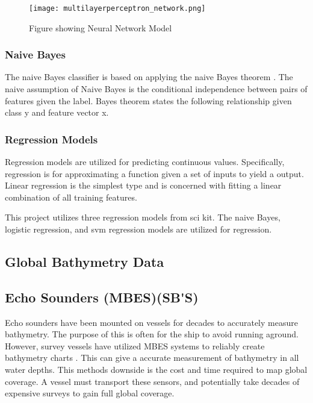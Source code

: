 \begin{figure}[h]
    \centering
    \texttt{[image: multilayerperceptron\_network.png]}
    \caption{Figure showing Neural Network Model}
    \label{}
\end{figure}



\subsubsection{Naive Bayes}
The naive Bayes classifier is based on applying the naive Bayes theorem \cite{zhang2004optimality}.
The naive assumption of Naive Bayes is the conditional independence between pairs of features given the label.
Bayes theorem states the following relationship given class y and feature vector x.



\subsubsection{Regression Models}
Regression models are utilized for predicting continuous values.
Specifically, regression is for approximating a function given a set of inputs to yield a output.
Linear regression is the simplest type and is concerned with fitting a linear combination of all training features.


This project utilizes three regression models from sci kit.
The naive Bayes\cite{sklearn_api}, logistic regression\cite{sklearn_api}, and svm regression\cite{sklearn_api} models are utilized for regression.

\subsection{Global Bathymetry Data}

\subsection{Echo Sounders (\ac{MBES})(\ac{SB'S}) }
Echo sounders have been mounted on vessels for decades to accurately measure bathymetry.
The purpose of this is often for the ship to avoid running aground.
However, survey vessels have utilized \ac{MBES} systems to reliably create bathymetry charts \cite{farr1980multibeam}.
This can give a accurate measurement of bathymetry in all water depths.
This methods downside is the cost and time required to map global coverage.
A vessel must transport these sensors, and potentially take decades of expensive surveys to gain full global coverage.

